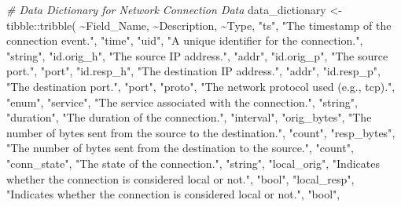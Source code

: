 \documentclass[
]{article}
\newenvironment{Shaded}{\begin{snugshade}}{\end{snugshade}}
\newcommand{\CommentTok}[1]{\textcolor[rgb]{0.56,0.35,0.01}{\textit{#1}}}
\newcommand{\FunctionTok}[1]{\textcolor[rgb]{0.00,0.00,0.00}{#1}}
\newcommand{\NormalTok}[1]{#1}
\newcommand{\OtherTok}[1]{\textcolor[rgb]{0.56,0.35,0.01}{#1}}
\newcommand{\SpecialCharTok}[1]{\textcolor[rgb]{0.00,0.00,0.00}{#1}}
\newcommand{\StringTok}[1]{\textcolor[rgb]{0.31,0.60,0.02}{#1}}
\begin{document}
\begin{Shaded}
\begin{Highlighting}[]
\CommentTok{\# Data Dictionary for Network Connection Data}
\NormalTok{data\_dictionary }\OtherTok{\textless{}{-}}\NormalTok{ tibble}\SpecialCharTok{::}\FunctionTok{tribble}\NormalTok{(}
  \SpecialCharTok{\textasciitilde{}}\NormalTok{Field\_Name,     }\SpecialCharTok{\textasciitilde{}}\NormalTok{Description,                                   }\SpecialCharTok{\textasciitilde{}}\NormalTok{Type,}
  \StringTok{"ts"}\NormalTok{,            }\StringTok{"The timestamp of the connection event."}\NormalTok{,      }\StringTok{"time"}\NormalTok{,}
  \StringTok{"uid"}\NormalTok{,           }\StringTok{"A unique identifier for the connection."}\NormalTok{,     }\StringTok{"string"}\NormalTok{,}
  \StringTok{"id.orig\_h"}\NormalTok{,     }\StringTok{"The source IP address."}\NormalTok{,                      }\StringTok{"addr"}\NormalTok{,}
  \StringTok{"id.orig\_p"}\NormalTok{,     }\StringTok{"The source port."}\NormalTok{,                            }\StringTok{"port"}\NormalTok{,}
  \StringTok{"id.resp\_h"}\NormalTok{,     }\StringTok{"The destination IP address."}\NormalTok{,                 }\StringTok{"addr"}\NormalTok{,}
  \StringTok{"id.resp\_p"}\NormalTok{,     }\StringTok{"The destination port."}\NormalTok{,                       }\StringTok{"port"}\NormalTok{,}
  \StringTok{"proto"}\NormalTok{,         }\StringTok{"The network protocol used (e.g., \textquotesingle{}tcp\textquotesingle{})."}\NormalTok{,    }\StringTok{"enum"}\NormalTok{,}
  \StringTok{"service"}\NormalTok{,       }\StringTok{"The service associated with the connection."}\NormalTok{, }\StringTok{"string"}\NormalTok{,}
  \StringTok{"duration"}\NormalTok{,      }\StringTok{"The duration of the connection."}\NormalTok{,             }\StringTok{"interval"}\NormalTok{,}
  \StringTok{"orig\_bytes"}\NormalTok{,    }\StringTok{"The number of bytes sent from the source to the destination."}\NormalTok{, }\StringTok{"count"}\NormalTok{,}
  \StringTok{"resp\_bytes"}\NormalTok{,    }\StringTok{"The number of bytes sent from the destination to the source."}\NormalTok{, }\StringTok{"count"}\NormalTok{,}
  \StringTok{"conn\_state"}\NormalTok{,    }\StringTok{"The state of the connection."}\NormalTok{,                }\StringTok{"string"}\NormalTok{,}
  \StringTok{"local\_orig"}\NormalTok{,    }\StringTok{"Indicates whether the connection is considered local or not."}\NormalTok{, }\StringTok{"bool"}\NormalTok{,}
  \StringTok{"local\_resp"}\NormalTok{,    }\StringTok{"Indicates whether the connection is considered local or not."}\NormalTok{, }\StringTok{"bool"}\NormalTok{,}

\end{Highlighting}
\end{Shaded}
\end{document}
